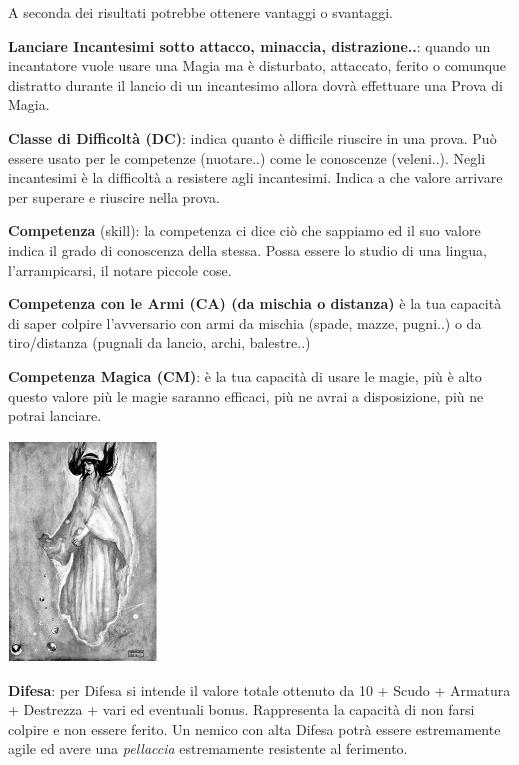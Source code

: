 \begin{multicols}{2}
A seconda dei risultati potrebbe ottenere vantaggi o svantaggi.

\textbf{Lanciare Incantesimi sotto attacco, minaccia, distrazione..}: quando un incantatore vuole usare una Magia ma è disturbato, attaccato, ferito o comunque distratto durante il lancio di un incantesimo allora dovrà effettuare una Prova di Magia.

\textbf{Classe di Difficoltà (DC)}: indica quanto è difficile riuscire in una prova. Può essere usato per le competenze (nuotare..) come le conoscenze (veleni..). Negli incantesimi è la difficoltà a resistere agli incantesimi. Indica a che valore arrivare per superare e riuscire nella prova.

\textbf{Competenza} (skill): la competenza ci dice ciò che sappiamo ed il suo valore indica il grado di conoscenza della stessa. Possa essere lo studio di una lingua, l'arrampicarsi, il notare piccole cose.

\textbf{Competenza con le Armi (CA) (da mischia o distanza)}  è la tua capacità di saper colpire l'avversario con armi da mischia (spade, mazze, pugni..) o da tiro/distanza (pugnali da lancio, archi, balestre..)

\textbf{Competenza Magica (CM)}: è la tua capacità di usare le magie, più è alto questo valore più le magie saranno efficaci, più ne avrai a disposizione, più ne potrai lanciare.

\begin{center}
\includegraphics[keepaspectratio,width=0.3\textwidth]{immagini/spiritomagia2.png}
\end{center}

\textbf{Difesa}: per Difesa si intende il valore totale ottenuto da 10 + Scudo + Armatura + Destrezza + vari ed eventuali bonus. Rappresenta la capacità di non farsi colpire e non essere ferito. Un nemico con alta Difesa potrà essere estremamente agile ed avere una \emph{pellaccia} estremamente resistente al ferimento.


\end{multicols}
